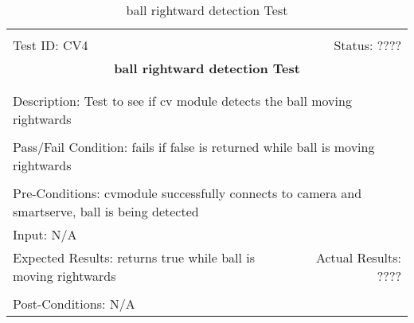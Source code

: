 \documentclass[11pt]{article}
\begin{document}
\begin{center}
\begin{table}[H]
\begin{tabular}{|l r|}\hline&\\[-2mm]
	Test ID: CV4	&Status: ????\\[-3mm]
	\multicolumn{2}{|c|}{\textbf{\large{ball rightward detection Test}}}\\&\\\hline&\\[-3mm]
	\multicolumn{2}{|p{\textwidth}|}{Description: Test to see if cv module detects the ball moving rightwards}\\[1mm]\hline&\\[-3mm]
	\multicolumn{2}{|p{\textwidth}|}{Pass/Fail Condition: fails if false is returned while ball is moving rightwards }\\[1mm]\hline&\\[-3mm]
	\multicolumn{2}{|p{\textwidth}|}{Pre-Conditions: cvmodule successfully connects to camera and smartserve, ball is being detected}\\[4mm]
	\multicolumn{2}{|p{\textwidth}|}{Input: N/A}\\[2mm]\hline
	\multicolumn{1}{|p{0.49\textwidth}}{Expected Results: returns true while ball is moving rightwards}	&\multicolumn{1}{|p{0.45\textwidth}|}{Actual Results: ????}\\\hline&\\[-3mm]
	\multicolumn{2}{|p{\textwidth}|}{Post-Conditions: N/A}\\\hline
\end{tabular}
\caption{ball rightward detection Test}
\end{table}
\end{center}
\end{document}
